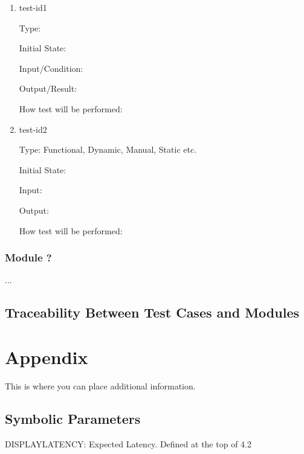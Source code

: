 \documentclass[12pt, titlepage]{article}
\begin{document}
\begin{enumerate}

\item{test-id1\\}

Type: 

Initial State:

Input/Condition:

Output/Result:

How test will be performed:

\item{test-id2\\}

Type: Functional, Dynamic, Manual, Static etc.

Initial State:

Input:

Output:

How test will be performed:

\end{enumerate}

\subsubsection{Module ?}

...

\subsection{Traceability Between Test Cases and Modules}






\newpage

\section{Appendix}

This is where you can place additional information.

\subsection{Symbolic Parameters}

DISPLAYLATENCY: Expected Latency. Defined at the top of 4.2
\end{document}
